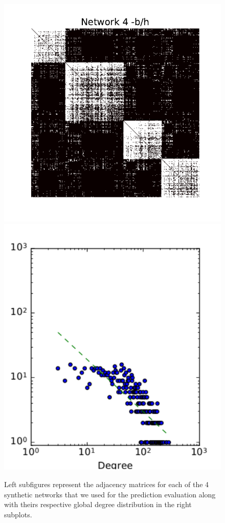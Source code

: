 \begin{figure}[h]
	\endminipage
	\vspace{-0.4cm}
	\includegraphics[scale=0.32]{img/g4}
	\endminipage
	\includegraphics[scale=0.32]{img/g4_d}
	\endminipage
	
	\caption{Left subfigures represent the adjacency matrices for each of the 4 synthetic networks that we used for the prediction evaluation along with theirs respective global degree distribution in the right subplots.}
	\label{fig:synt_graph}
\end{figure}

\vspace{1cm}
